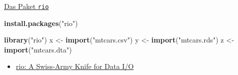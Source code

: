 \documentclass[ignorenonframetext,]{beamer}
\newenvironment{Shaded}{}{}
\newcommand{\KeywordTok}[1]{\textcolor[rgb]{0.00,0.44,0.13}{\textbf{{#1}}}}
\newcommand{\StringTok}[1]{\textcolor[rgb]{0.25,0.44,0.63}{{#1}}}
\newcommand{\NormalTok}[1]{{#1}}
\providecommand{\tightlist}{%
\setlength{\itemsep}{0pt}\setlength{\parskip}{0pt}}
\begin{document}
\begin{frame}[fragile]{\href{https://cran.r-project.org/web/packages/rio/vignettes/rio.html}{Das
Paket \texttt{rio}}}

\begin{Shaded}
\begin{Highlighting}[]
\KeywordTok{install.packages}\NormalTok{(}\StringTok{"rio"}\NormalTok{)}
\end{Highlighting}
\end{Shaded}

\begin{Shaded}
\begin{Highlighting}[]
\KeywordTok{library}\NormalTok{(}\StringTok{"rio"}\NormalTok{)}
\NormalTok{x <-}\StringTok{ }\KeywordTok{import}\NormalTok{(}\StringTok{"mtcars.csv"}\NormalTok{)}
\NormalTok{y <-}\StringTok{ }\KeywordTok{import}\NormalTok{(}\StringTok{"mtcars.rds"}\NormalTok{)}
\NormalTok{z <-}\StringTok{ }\KeywordTok{import}\NormalTok{(}\StringTok{"mtcars.dta"}\NormalTok{)}
\end{Highlighting}
\end{Shaded}

\begin{itemize}
\tightlist
\item
  \href{https://cran.r-project.org/web/packages/rio/README.html}{rio: A
  Swiss-Army Knife for Data I/O}
\end{itemize}

\end{frame}
\end{document}
